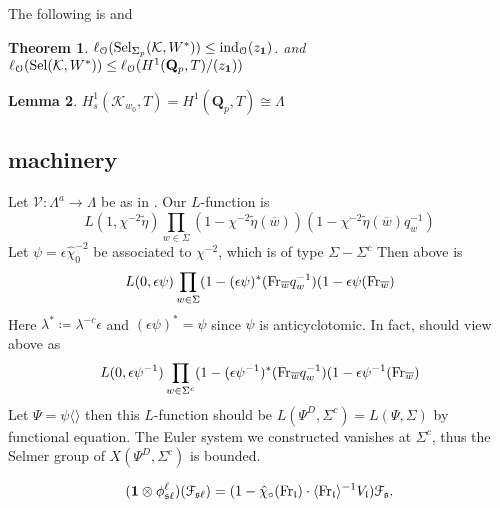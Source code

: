 \documentclass[leqno]{amsart}
\newtheorem{thm}{Theorem}[section]
\newtheorem{lem}[thm]{Lemma}
\theoremstyle{definition}
\theoremstyle{remark}
\newcommand{\id}{\mathbf{1}}
\newcommand{\eo}{\EuScript{O}}
\newcommand{\Qp}{\mathbf{Q}_p}
\DeclareMathOperator{\ind}{ind} %
\newcommand{\Fr}{\textnormal{Fr}} %
\newcommand{\fl}{\mathfrak{l}}
\newcommand{\fs}{\mathfrak{s}}
\newcommand{\K}{{\mathcal{K}}} %
\newcommand{\bw}{\overline{w}}
\newcommand{\euF}{\EuScript{F}} %
\DeclareMathOperator{\Sel}{Sel}
\begin{document}
The following is 
\cite[Thm 2,2,2]{Rubin} and
\cite[Thm 2,2,10]{Rubin}
\begin{thm}
$\ell_{\eo}(\Sel_{\Sigma_p}(\K, W^*))\leq \ind_{\eo}(z_{\id})$.
and $\ell_{\eo}(\Sel(\K, W^*))\leq \ell_{\eo}(H^1(\Qp,T)/(z_{\id}))$
\end{thm}


\begin{lem}
    $H^1_s(\K_{w_0},T)=H^1(\Qp,T)\cong \Lambda$
\end{lem}




\subsection{machinery}

Let $\mathscr{V}\colon \Lambda^a\to \Lambda$
be as in \cite{HT94}.
Our $L$-function is
\[
L(1,\chi^{-2}\tilde{\eta})\prod_{w\in\Sigma}
(1-\chi^{-2}\tilde{\eta}(\bw))
(1-\chi^{-2}\tilde{\eta}(\bw)q_w^{-1})
\]
Let $\psi=\epsilon\hat{\chi}_0^{-2}$ be associated to 
$\chi^{-2}$, which is of type $\Sigma-\Sigma^c$
Then above is 
\[
	L(0,\epsilon\psi)\prod_{w\in \Sigma}
	(1-(\epsilon\psi)^*(\Fr_{\bw}q_w^{-1})
	(1-\epsilon\psi(\Fr_{\bw})
\]
Here  $\lambda^*\coloneqq \lambda^{-c}\epsilon$ 
and $(\epsilon\psi)^*=\psi$ since  $\psi$
is anticyclotomic.
In fact, should view above as
\[
	L(0,\epsilon\psi^{-1})\prod_{w\in\Sigma^c}
	(1-(\epsilon\psi^{-1})^*(\Fr_{\bw}q_w^{-1})
	(1-\epsilon\psi^{-1}(\Fr_{\bw})
\]
Let $\Psi=\psi\langle\rangle$
then this  $L$-function
should be $L(\Psi^D,\Sigma^c)=L(\Psi,\Sigma)$
by functional equation.
The Euler system we constructed vanishes at  $\Sigma^c$,
thus the Selmer group of  $X(\Psi^D,\Sigma^c)$
is bounded. 


\cite{Och05}
\cite{Och08}
\cite{Hsieh2010}
\cite{HT93}
\cite{Hida06}
\cite{Hida06b}
\cite{Rubin}


\appendix

\begin{equation*}
    (\id\otimes\phi^\ell_{\fs\ell})(\euF_{\fs\ell})=
	(1-\hat{\chi}_\circ(\Fr_\fl)\cdot 
	\langle \Fr_\fl\rangle^{-1} V_\fl)
	\euF_{\fs}.
\end{equation*}
\end{document}
